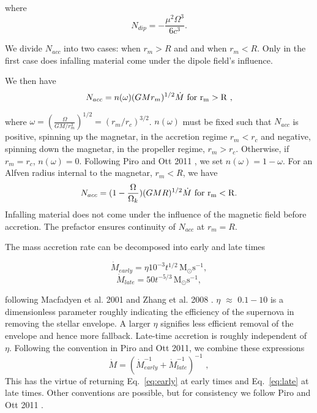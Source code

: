 \documentclass{article}
\begin{document}
where
\begin{equation}
N_{dip}= -\frac{\mu^{2}\Omega^{3}}{6 c^{3}}.
\end{equation}

We divide $N_{acc}$ into two cases: when $r_m>R$ and and when $r_m<R$. Only in the first case does infalling material come under the dipole field's influence.

We then have
\begin{equation}
N_{acc}= n(\omega) (GMr_m)^{1/2} \dot{M}\, \,  \rm{for \,\, r_m>R}\,\,,
\end{equation}

where $\omega=(\frac{\Omega}{GM/r_m^3})^{1/2}=(r_m/r_c)^{3/2}$. $n(\omega)$ must be fixed such that $N_{acc}$ is positive, spinning up the magnetar, in the accretion regime $r_m<r_c$ and negative, spinning down the magnetar, in the propeller regime, $r_m>r_c$. Otherwise, if $r_m=r_c$, $n(\omega)=0$. Following Piro and Ott 2011 \cite{Piro:2011ed}, we set $n(\omega)=1-\omega$. For an Alfven radius internal to the magnetar, $r_m<R$, we have
\begin{equation}
N_{acc}=(1-\frac{\Omega}{\Omega_k})(GMR)^{1/2} \dot{M}\, \,  \rm{for \,\, r_m<R}.
\end{equation}
Infalling material does not come under the influence of the magnetic field before accretion. The prefactor ensures continuity of $N_{acc}$ at $r_m=R$.

The mass accretion rate can be decomposed into early and late times

\begin{equation} \label{eq:early}
\dot{M}_{early} = \eta 10^{-3}t^{1/2} \, \mathrm{M_{\odot }s^{-1}},
\end{equation}
\begin{equation} \label{eq:late}
\dot{M}_{late}=50 t^{-5/3}\, \mathrm{M_{\odot} s^{-1}},
\end{equation}

following Macfadyen et al. 2001 \cite{Macfadyen:1999mk} and Zhang et al. 2008 \cite{Zhang:2007nw}. $\eta$ $\approx$ $0.1-10$ is a dimensionless parameter roughly indicating the efficiency of the supernova in removing the stellar envelope. A larger $\eta$ signifies less efficient removal of the envelope and hence more fallback. Late-time accretion is roughly independent of $\eta$.
Following the convention in Piro and Ott 2011, we combine these expressions
\begin{equation}
\dot{M}=(\dot{M}_{early}^{-1}+\dot{M}_{late}^{-1})^{-1}\,\,,
\end{equation}
This has the virtue of returning Eq.~\ref{eq:early} at early times and Eq.~\ref{eq:late} at late times. Other conventions are possible, but for consistency we follow Piro and Ott 2011 \cite{Piro:2011ed}.
\end{document}
